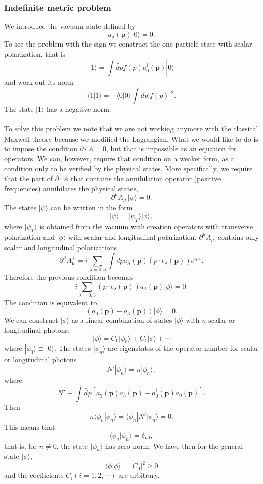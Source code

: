 \subsubsection{Indefinite metric problem}
We introduce the vacuum state defined by
\[a_{\lambda}(\bm{p}) | 0 \rangle = 0.\]
To see the problem with the sign we construct the one-particle state with scalar polarization, that is
\[|1\rangle = \int \widetilde{dp} f(p) a^{\dagger}_{0}(\bm{p})|0\rangle \]
and work out its norm
\[\langle 1 | 1 \rangle = -\langle 0 | 0 \rangle \int \widetilde{dp} |f(p)|^2.\]
The state $| 1 \rangle$ has a negative norm.
\\ \\
To solve this problem we note that we are not working anymore with the classical Maxwell theory because we modified the Lagrangian. What we would like to do is to impose the condition $\partial \cdot A = 0$, but that is impossible as an equation for operators. We can, however, require that condition on a weaker form, as a condition only to be verified by the physical states.
More specifically, we require that the part of $\partial \cdot A$ that contains the annihilation operator (positive frequencies) annihilates the physical states,
\[\partial^{\mu} A^{+}_{\mu} | \psi \rangle = 0.\]
The states $| \psi \rangle$ can be written in the form
\[| \psi \rangle = | \psi_T \rangle | \phi \rangle,\]
where $| \psi_T \rangle$  is obtained from the vacuum with creation operators with transverse polarization and $| \phi \rangle$ with scalar and longitudinal polarization.
$\partial^{\mu} A^{+}_{\mu}$ contains only scalar and longitudinal polarizations
\[\partial^{\mu} A^{+}_{\mu} = i\sum_{\lambda=0,3} \int \widetilde{dp} a_{\lambda}(\bm{p}) (p \cdot \epsilon_{\lambda}(\bm{p}) ) e^{ipx} .\]
Therefore the previous condition becomes
\[i\sum_{\lambda=0,3} (p \cdot \epsilon_{\lambda}(\bm{p})) a_{\lambda}(\bm{p})  | \phi \rangle = 0.\]
The condition is equivalent to,
\[(a_{0}(\bm{p}) - a_{3}(\bm{p})) | \phi \rangle = 0.\]
We can construct $| \phi \rangle$ as a linear combination of states $| \phi \rangle$ with $n$ scalar or longitudinal photons:
\[| \phi \rangle = C_0 | \phi_0 \rangle + C_1 | \phi \rangle + \cdots\]
where $| \phi_0 \rangle \equiv | 0 \rangle$.
The states $|\phi_n\rangle$ are eigenstates of the operator number for scalar or longitudinal photons
\[N' | \phi_n \rangle = n | \phi_n \rangle,\]
where
\[N' \equiv \int \widetilde{dp} [a^{\dagger}_{3}(\bm{p})a_{3}(\bm{p})-a^{\dagger}_{0}(\bm{p})a_{0}(\bm{p})] .\]
Then
\[n \langle \phi_n | \phi_n \rangle = \langle \phi_n |N'| \phi_n \rangle = 0.\]
This means that
\[\langle \phi_n | \phi_n \rangle = \delta_{n0},\]
that is, for $n \neq 0$, the state $| \phi_n \rangle$ has zero norm. We have then for the general state $| \phi \rangle$,
\[\langle \phi | \phi \rangle = |C_0|^2 \geq 0\]
and the coefficients $C_i(i=1,2,\cdots)$ are arbitrary.

